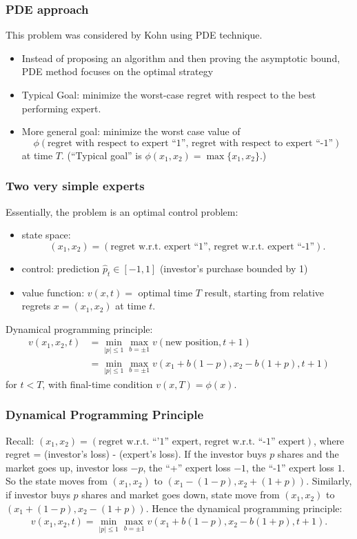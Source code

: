 \documentclass{beamer}
\begin{document}
\begin{frame}
\frametitle{PDE approach}
This problem was considered by Kohn using PDE technique.  
\begin{itemize}
\item Instead of proposing an algorithm and then proving the asymptotic bound, PDE method focuses on the optimal strategy
\pause
\item Typical Goal: minimize the worst-case regret with respect to the best performing expert.
\pause
\item More general goal: minimize the worst case value of 
$$\phi(\text{regret with respect to expert ``1'', regret with respect to expert ``-1''})$$
at time $T$. (``Typical goal'' is $\phi(x_1,x_2) = \max\{x_1,x_2\}$.)
\end{itemize}


\end{frame}

\begin{frame}
\frametitle{Two very simple experts}
Essentially,  the problem is an optimal control problem:
\begin{itemize}
\pause
\item{\color{red}state space:}$$(x_1,x_2) = (\text{regret w.r.t.  expert ``1'', regret w.r.t.  expert ``-1''}).$$
\pause
\item {\color{red}control:} prediction $\hat{p}_t\in[-1,1]$ ({\color{blue}investor's purchase bounded by 1}) 
\pause
\item {\color{red}value function:} $v(x,t) = $ optimal time $T$ result, starting from relative regrets $x = (x_1,x_2)$ at time $t$. 
\end{itemize}

{\color{red}Dynamical programming principle:}
\begin{align*}
v(x_1,x_2,t) &= \min_{|p|\le 1}\max_{b = \pm 1}v(\text{new position},t+1)\\
                    & = \min_{|p|\le 1}\max_{b = \pm 1}v(x_1 + b(1-p),x_2-b(1+p),t+1)		
\end{align*}
for $t<T$, with final-time condition $v(x,T) = \phi(x).$

\end{frame}

\begin{frame}
\frametitle{Dynamical Programming Principle}
Recall: {\color{red}$(x_1,x_2) = (\text{regret w.r.t. ``'1'' expert, regret w.r.t. ``-1'' expert})$}, where regret  = (investor's loss) - (expert's loss).
\vfill
If the investor buys $p$ shares and the market goes up, investor loss $-p$, the 
``+'' expert loss $-1$, the ``-1'' expert loss $1$. So the state moves from $(x_1,x_2)$ to $(x_1-(1-{p}),x_2+(1+{p})).$
\vfill
Similarly, if investor buys ${p}$ shares  and market goes down, state move from $(x_1,x_2)$ to $(x_1+(1-{p}),x_2-(1+{p})).$
\vfill
Hence the dynamical programming principle:
 \begin{align*}
 v(x_1,x_2,t) = \min_{|p|\le 1}\max_{b = \pm 1}v(x_1 + b(1-p),x_2-b(1+p),t+1).
 \end{align*}

\end{frame}
\end{document}
